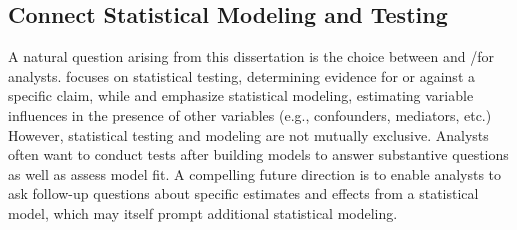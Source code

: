 \begin{comment}
\subsection{Support more phases of the data lifecycle}
This dissertation emphasizes the need for abstractions that capture analysts'
implicit domain knowledge. These abstractions enable valid analysis formulation
and promote reflective thinking. Building upon this, we can begin to ask how the
same ideas---abstractions and automated reasoning for conceptual knowledge often
implicit in statistical analyses---could apply to other phases of the data
lifecycle. Future work should explore how to elicit and track the evolution of
conceptual knowledge even before statistical analysis by developing new
elicitation techniques and representations of domain knowledge and ecosystem of
inter-operating tools to track and ensure validity throughout the data lifecycle. 

\end{comment}

\subsection{Connect Statistical Modeling and Testing} 
A natural question arising from this dissertation is the choice between \tea and
\tisane/\rTisane for analysts. \tea focuses on statistical testing, determining
evidence for or against a specific claim, while \tisane and \rTisane emphasize
statistical modeling, estimating variable influences in the presence of other
variables (e.g., confounders, mediators, etc.) However, statistical testing and
modeling are not mutually exclusive. Analysts often want to conduct tests after
building models to answer substantive questions as well as assess model fit. A
compelling future direction is to enable analysts to ask follow-up questions
about specific estimates and effects from a statistical model, which may itself
prompt additional statistical modeling. 


